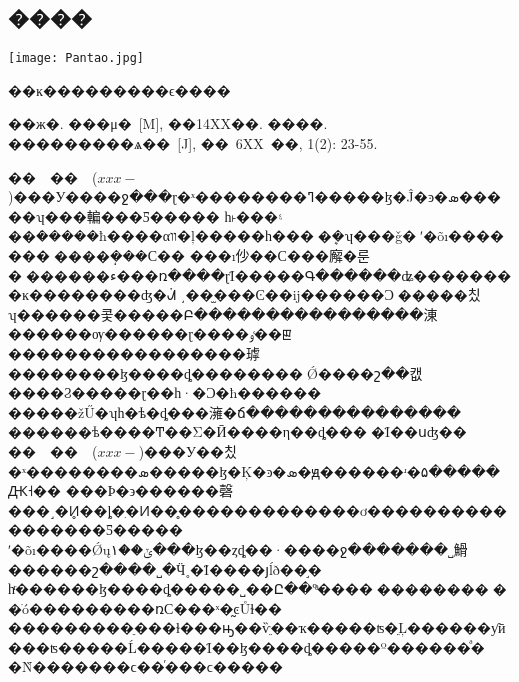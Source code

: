 \documentclass[a4paper,11pt,onecolumn,twoside]{article}
\makeatletter
\newenvironment{figurehere}
  {\def\@captype{figure}}
  {}
\makeatother
\begin{document}
\begin{CJK*}{GBK}{song}
\begin{multicols}{2}
\section{����}
\begin{figurehere}
\centering
\texttt{[image: Pantao.jpg]}
\caption{��ĸ���������ϵ����}\label{fig2}
\end{figurehere}
\small
\begin{thebibliography}{99}
\setlength{\parskip}{0pt}  %
��ж�. ���μ�~[M], ��14XX��.
 ����. ���������ѧ��~[J], ��~6XX~��, 1(2): 23-55.

\end{thebibliography}
\normalsize
{}
\indent ��~~��~~($xxx-$)���У����ջ���ɽ�ˣ��������ߣ�����ɮ�Ĵ�ͽ�ܣ�����ʮ���䡢���Ƽ�����
һ˫���۽𾦣��ܿ�����ħ����αװ�ļ�����һ����ܷ�ʮ���ǧ�ʹ�õı�������𹿰����ܴ���С��
���ı仯��С���廨�룬�󵽶������ء���ռ����ɽΪ�����Գ������ʥ��������ĸ��������ʤ�ᣬ
͵��̫���Ͼ��ĳ������Ͻ𵤣�����칬ʮ������콫�����Բ����������������涷������ѹ������ɽ����ٶ��ꡣ
�����������������㻯��������ɮ����ȡ��������׹Ǿ����շ��캢����Ϩ�����ɽ��һ·�Ͻ�ħ������
�����žŰ�ʮһ�ѣ�ȡ���澭�ճ���������������𣬲������ѣ����Ͳ��Σ�Ӣ����η��ȡ���󱻷�Ϊ��սʤ��\\
\indent ��~~��~~($xxx-$)���У��칬�ˣ��������ܣ�����ɮ�Ķ�ͽ�ܣ�ԭ������ʴ�۵�����Ԫ˧��
���Ϸ�϶������磬���˼�Ͷ̥��ȴ�ִ�Ͷ��̥�������������ơ�����������������Ƽ�����
ʹ�õı����Ǿųݶ��١���ɮ��ȥȡ��·����ջ�������˽䱻������շ����˽�Ӵ˳�Ϊ����յĺð��֣�
һͬ������ɮ����ȡ�����˽��Ը��ºͣ����񵥴��������󣬵��ֺó���������ռС���ˣ�̰ͼŮɫ��
���������ֵ���ɫ���ԣ��ѷֵ��ҡ�����ʦ�ֵĻ������ƴӣ���ʦ�����Ĺ�����Ϊ��ɮ����ȡ�����º������ͣ�
�Ǹ�������ϲ��ͬ���ϲ�����
\end{multicols}
\clearpage
\end{CJK*}
\end{document}
